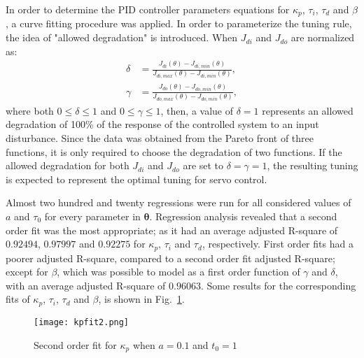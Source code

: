 In order to determine the PID controller parameters equations for $\kappa_p$, $\tau_i$, $\tau_d$ and $\beta$, a curve fitting procedure was applied. In order to parameterize the tuning rule, the idea of "allowed degradation" is introduced. When $J_{di}$ and $J_{do}$ are normalized as:
%
\begin{align}
\delta &= \frac{J_{di}(\theta)-J_{di, min}(\theta)}{J_{di,max}(\theta)-J_{di,min}(\theta)},\label{eq:delta}\\
\gamma &= \frac{J_{do}(\theta)-J_{do, min}(\theta)}{J_{do,max}(\theta)-J_{do,min}(\theta)},\label{eq:gamma}
\end{align}
%
where both $0 \le \delta \le 1$ and $0 \le \gamma \le 1$, then, a value of $\delta=1$ represents an allowed degradation of 100\% of the response of the controlled system to an input disturbance. Since the data was obtained from the Pareto front of three functions, it is only required to choose the degradation of two functions. If the allowed degradation for both $J_{di}$ and $J_{do}$ are set to $\delta=\gamma=1$, the resulting tuning is expected to represent the optimal tuning for servo control.

Almost two hundred and twenty regressions were run for all considered values of $a$ and $\tau_0$ for every parameter in $\bm{\theta}$. Regression analysis revealed that a second order fit was the most appropriate; as it had an average adjusted R-square of $0.92494$, $0.97997$ and $0.92275$ for $\kappa_p$, $\tau_i$ and $\tau_d$, respectively. First order fits had a poorer adjusted R-square, compared to a second order fit adjusted R-square; except for $\beta$, which was possible to model as a first order function of $\gamma$ and $\delta$, with an average adjusted R-square of $0.96063$. Some results for the corresponding fits of $\kappa_p$, $\tau_i$, $\tau_d$ and $\beta$, is shown in Fig.~\ref{F:cftoolkp}.%
%
\begin{figure}
	\centering
	\texttt{[image: kpfit2.png]}
	\caption{Second order fit for $\kappa_p$ when $a=0.1$ and $t_{0}=1$}
	\label{F:cftoolkp}
\end{figure}
%
%

